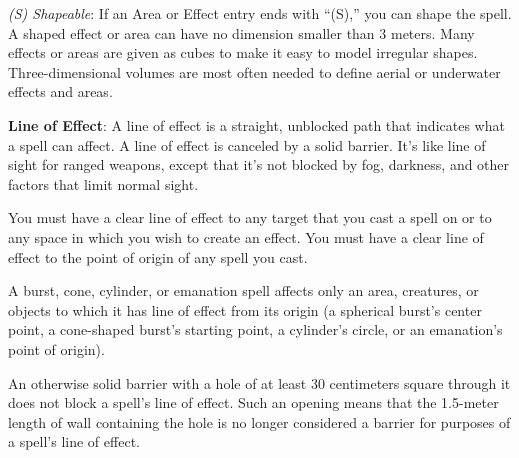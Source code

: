 \textit{(S) Shapeable}: If an Area or Effect entry ends with ``(S),'' you can shape the spell. A shaped effect or area can have no dimension smaller than 3 meters. Many effects or areas are given as cubes to make it easy to model irregular shapes. Three-dimensional volumes are most often needed to define aerial or underwater effects and areas.

\textbf{Line of Effect}: A line of effect is a straight, unblocked path that indicates what a spell can affect. A line of effect is canceled by a solid barrier. It's like line of sight for ranged weapons, except that it's not blocked by fog, darkness, and other factors that limit normal sight.

You must have a clear line of effect to any target that you cast a spell on or to any space in which you wish to create an effect. You must have a clear line of effect to the point of origin of any spell you cast.

A burst, cone, cylinder, or emanation spell affects only an area, creatures, or objects to which it has line of effect from its origin (a spherical burst's center point, a cone-shaped burst's starting point, a cylinder's circle, or an emanation's point of origin).

An otherwise solid barrier with a hole of at least 30 centimeters square through it does not block a spell's line of effect. Such an opening means that the 1.5-meter length of wall containing the hole is no longer considered a barrier for purposes of a spell's line of effect.